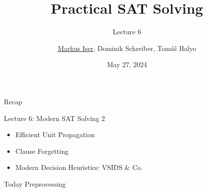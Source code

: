 \documentclass[t]{sdqbeamer}
\title[SAT Solving]{Practical SAT Solving}
\subtitle{Lecture 6}
\author{\underline{Markus Iser}, Dominik Schreiber, Tom\'a\v{s} Balyo}
\date{May 27, 2024}
\begin{document}
\begin{frame}
	\thispagestyle{empty}
	\titlepage
\end{frame}


\begin{frame}{Recap}
    \begin{block}{Lecture 6: Modern SAT Solving 2}
		\begin{itemize}\setlength{\itemsep}{1ex}
			\item Efficient Unit Propagation
			\item Clause Forgetting
			\item Modern Decision Heuristics: VSIDS \& Co.
		\end{itemize}
    \end{block}
	\begin{block}{Today}
        Preprocessing
	\end{block}
\end{frame}
\end{document}
